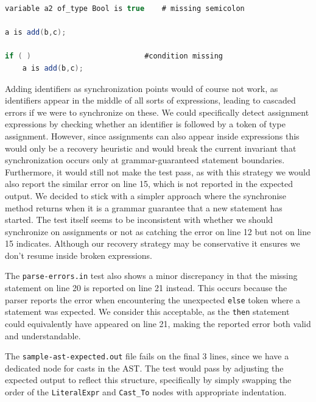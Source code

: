 \begin{lstlisting}[language=Java, firstnumber=10]
variable a2 of_type Bool is true 	# missing semicolon

a is add(b,c);

if ( ) 							#condition missing
	a is add(b,c);
\end{lstlisting}

Adding identifiers as synchronization points would of course not work, as identifiers appear in the middle
of all sorts of expressions, leading to cascaded errors if we were to synchronize on these.
We could specifically detect assignment expressions by checking whether an identifier is followed by a token of type assignment.
However, since assignments can also appear inside expressions this would only be a recovery heuristic and would break the current invariant 
that synchronization occurs only at grammar-guaranteed statement boundaries. 
Furthermore, it would still not make the test pass, as with this strategy we would also report the similar error on line 15,
which is not reported in the expected output.
We decided to stick with a simpler approach where the synchronise method returns when it is a grammar guarantee that a new statement has started.
The test itself seems to be inconsistent with whether we should synchronize on assignments or not as catching the error on line 12 but not on line 15 indicates.
Although our recovery strategy may be conservative it ensures we don't resume inside broken expressions.


The \texttt{parse-errors.in} test also shows a minor discrepancy in that the missing statement on line 20 
is reported on line 21 instead.
This occurs because the parser reports the error when encountering the unexpected \texttt{else} token where a statement was expected.
We consider this acceptable, as the \texttt{then} statement could equivalently have appeared on line 21, making the reported error both valid and understandable.

The \texttt{sample-ast-expected.out} file fails on the final 3 lines, since we have a dedicated node for casts in the AST.
The test would pass by adjusting the expected output to reflect this structure, specifically by simply
swapping the order of the \texttt{LiteralExpr} and \texttt{Cast\_To} nodes with appropriate indentation.

